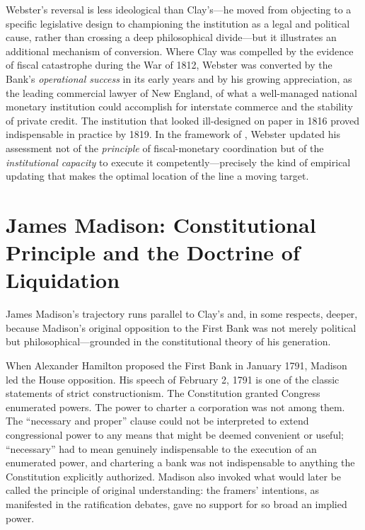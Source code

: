 \documentclass[12pt]{article}
\begin{document}
Webster's reversal is less ideological than Clay's---he moved from
objecting to a specific legislative design to championing the
institution as a legal and political cause, rather than crossing a deep
philosophical divide---but it illustrates an additional mechanism of
conversion.  Where Clay was compelled by the evidence of fiscal
catastrophe during the War of 1812, Webster was converted by the Bank's
\emph{operational success} in its early years and by his growing
appreciation, as the leading commercial lawyer of New England, of what
a well-managed national monetary institution could accomplish for
interstate commerce and the stability of private credit.  The
institution that looked ill-designed on paper in 1816 proved
indispensable in practice by 1819.  In the framework of
\citet{Sargent2011}, Webster updated his assessment not of the
\emph{principle} of fiscal-monetary coordination but of the
\emph{institutional capacity} to execute it competently---precisely
the kind of empirical updating that makes the optimal location of the
line a moving target.


\section{James Madison: Constitutional Principle and the Doctrine of
         Liquidation}

James Madison's trajectory runs parallel to Clay's and, in some respects,
deeper, because Madison's original opposition to the First Bank was not
merely political but philosophical---grounded in the constitutional theory of his generation.

When Alexander Hamilton proposed the First Bank in January 1791,
Madison led the House opposition.  His speech of February 2, 1791 is one
of the classic statements of strict constructionism.  The Constitution
granted Congress enumerated powers.  The power to charter a corporation
was not among them.  The ``necessary and proper'' clause could not
be interpreted to extend congressional power to any means that might be
deemed convenient or useful; ``necessary'' had to mean genuinely
indispensable to the execution of an enumerated power, and chartering a
bank was not indispensable to anything the Constitution explicitly
authorized.  Madison also invoked what would later be called
the principle of original understanding: the framers'
intentions, as manifested in the ratification debates, gave no
support for so broad an implied power.
\end{document}
